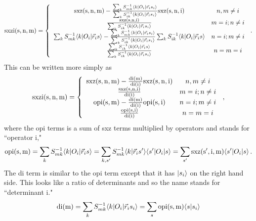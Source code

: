 \begin{equation} 
{\rm sxzi(s,n,m)} =  \left \{ 
\begin{array}{cc} 
{\rm sxz(s,n,m)} - 
\frac{\sum_k S^{-1}_{mk}\langle k |O_i|\vec r_i s_i\rangle} 
{\sum_k S^{-1}_{ik}\langle k |O_i|\vec r_i s_i\rangle} {\rm sxz(s,n,i)} & n,m \ne i\\ 
\frac{\rm sxz(s,n,i)} 
{\sum_k S^{-1}_{ik}\langle k |O_i|\vec r_i s_i\rangle} & m=i; n \ne i\\ 
\sum_k S^{-1}_{mk}\langle k |O_i|\vec r_i s\rangle 
- 
\frac{\sum_k S^{-1}_{mk}\langle k |O_i|\vec r_i s_i\rangle} 
{\sum_k S^{-1}_{ik}\langle k |O_i|\vec r_i s_i\rangle} 
\sum_k S^{-1}_{ik}\langle k |O_i|\vec r_i s\rangle 
& n=i; m \ne i\\ 
\frac{\sum_k S^{-1}_{ik} \langle k|O_i|\vec r_i s\rangle} 
{\sum_k S^{-1}_{ik} \langle k|O_i|\vec r_i s_i\rangle} & n=m=i\\ 
\end{array} 
\right . \,. 
\end{equation}
This can be written more simply as
\begin{equation}
   {\rm sxzi(s,n,m)} =  \left \{
\begin{array}{cc}
{\rm sxz(s,n,m)} -
\frac{{\rm di(m)}}
{{\rm di(i)}} {\rm sxz(s,n,i)} & n,m \ne i\\
\frac{\rm sxz(s,n,i)}
{{\rm di(i)}} & m=i; n \ne i\\
{\rm opi(s,m)} - \frac{{\rm di(m)}}{\rm di(i)} {\rm opi(s,i)} & n=i; m \ne i\\
\frac{\rm opi(s,i)}{\rm di(i)} & n=m=i\\
\end{array}
\right . \,,
\end{equation}
where the opi terms is a sum of sxz terms multiplied by operators and stands for ``operator i,"
\begin{eqnarray}
{\rm opi(s,m)} =
\sum_k S^{-1}_{mk}\langle k |O_i|\vec r_i s\rangle
= 
\sum_{k,s'} S^{-1}_{mk}\langle k | \vec r_i s'\rangle \langle s'|O_i|s\rangle
=  \sum_{s'} {\rm sxz(s',i,m)} \langle s'|O_i|s\rangle \,.
\end{eqnarray}
The di term is similar to the opi term except that it has $\left| s_i \right>$ on the right hand side. This looks like a ratio of determinants and so the name stands for ``determinant i."
\begin{equation}
   {\rm di(m)} = 
\sum_k S^{-1}_{mk}\langle k |O_i|\vec r_i s_i\rangle
= \sum_s {\rm opi(s,m)} \langle s|s_i\rangle
\end{equation}

